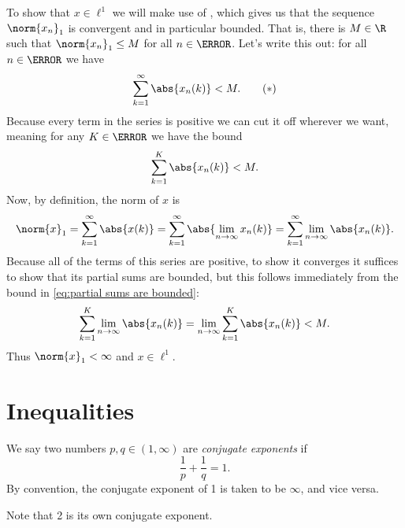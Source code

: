 \documentclass[12pt,oneside]{book}
\begin{document}
To show that \( x \in \ell^1 \) we will make use of , which gives us that the sequence \( \norm{x_n}_1 \) is convergent and in
particular bounded. That is, there is \( M \in \R \) such that \( \norm{x_n}_1 \leq M \)
for all \( n \in \N \). Let's write this out: for all \( n \in \N \) we have
\begin{equation} \label{eq:partial sums are bounded}
	\sum_{k = 1}^{\infty} \abs{x_n(k)} < M. \tag{\( \ast \)} 
\end{equation}
Because every term in the series is positive we can cut it off wherever we want, meaning
for any \( K \in \N \) we have the bound
\begin{equation*}
	\sum_{k = 1}^{K} \abs{x_n(k)} < M. 
\end{equation*}
Now, by definition, the norm of \( x \) is
\begin{equation*}
	\norm{x}_1 = \sum_{k = 1}^{\infty} \abs{x(k)} = \sum_{k = 1}^{\infty} \abs{\lim_{n \to
	\infty} x_n(k)} = \sum_{k = 1}^{\infty} \lim_{n \to \infty} \abs{x_n(k)}.
\end{equation*}
Because all of the terms of this series are positive, to show it converges it suffices to
show that its partial sums are bounded, but this follows immediately from the bound in
\eqref{eq:partial sums are bounded}:
\begin{equation*}
	\sum_{k = 1}^{K} \lim_{n \to \infty} \abs{x_n(k)} = \lim_{n \to \infty} \sum_{k =
	1}^{K} \abs{x_n(k)} < M.
\end{equation*}
Thus \( \norm{x}_1 < \infty \) and \( x \in \ell^1 \).

\section{Inequalities}

\begin{definition}
	We say two numbers \( p, q \in (1, \infty) \) are \emph{conjugate exponents} if
	\begin{equation*}
		\frac{1}{p} + \frac{1}{q} = 1.
	\end{equation*}
	By convention, the conjugate exponent of 1 is taken to be \( \infty \), and vice versa.
\end{definition}
Note that 2 is its own conjugate exponent.
\end{document}
